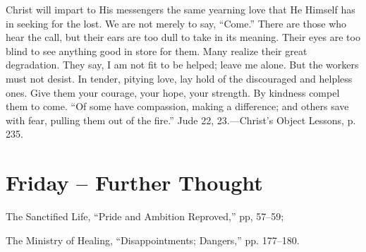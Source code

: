 \documentclass[a4paper, 10pt, twoside, headings=small]{scrartcl}
\begin{document}
\begin{multicols}{2}
Christ will impart to His messengers the same yearning love that He Himself has in seeking for the lost. We are not merely to say, “Come.” There are those who hear the call, but their ears are too dull to take in its meaning. Their eyes are too blind to see anything good in store for them. Many realize their great degradation. They say, I am not fit to be helped; leave me alone. But the workers must not desist. In tender, pitying love, lay hold of the discouraged and helpless ones. Give them your courage, your hope, your strength. By kindness compel them to come. “Of some have compassion, making a difference; and others save with fear, pulling them out of the fire.” Jude 22, 23.—Christ’s Object Lessons, p. 235.

\section*{Friday – Further Thought}

\setlength{\parindent}{0pt}The Sanctified Life, “Pride and Ambition Reproved,” pp, 57–59;

The Ministry of Healing, “Disappointments; Dangers,” pp. 177–180.

\end{multicols}
\end{document}
